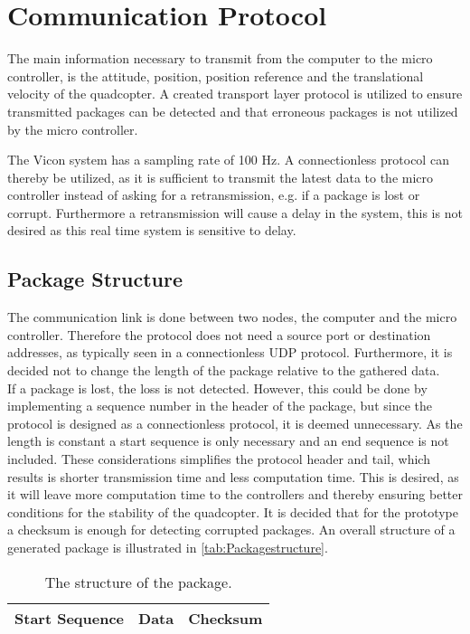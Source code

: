 \section{Communication Protocol}
The main information necessary to transmit from the computer to the micro controller, is the attitude, position, position reference and the translational velocity of the quadcopter. A created transport layer protocol is utilized to ensure transmitted packages can be detected and that erroneous packages is not utilized by the micro controller.

The Vicon system has a sampling rate of 100 Hz. A connectionless protocol can thereby be utilized, as it is sufficient to transmit the latest data to the micro controller instead of asking for a retransmission, e.g. if a package is lost or corrupt. Furthermore a retransmission will cause a delay in the system, this is not desired as this real time system is sensitive to delay.

\subsection{Package Structure}
The communication link is done between two nodes, the computer and the micro controller. Therefore the protocol does not need a source port or destination addresses, as typically seen in a connectionless UDP protocol. Furthermore, it is decided not to change the length of the package relative to the gathered data.\\
If a package is lost, the loss is not detected. However, this could be done by implementing a sequence number in the header of the package, but since the protocol is designed as a connectionless protocol, it is deemed unnecessary. As the length is constant a start sequence is only necessary and an end sequence is not included. These considerations simplifies the protocol header and tail, which results is shorter transmission time and less computation time. This is desired, as it will leave more computation time to the controllers and thereby ensuring better conditions for the stability of the quadcopter. It is decided that for the prototype a checksum is enough for detecting corrupted packages. An overall structure of a generated package is illustrated in \autoref{tab:Packagestructure}.

\begin{table}[H]\centering
\begin{tabular}{|>{\centering\arraybackslash}m{3cm}|>{\centering\arraybackslash}m{2cm}|>{\centering\arraybackslash}m{2cm}|}
\hline
Start Sequence & Data & Checksum \\
\hline
\end{tabular}
\caption{The structure of the package.}
\label{tab:Packagestructure}
\end{table}

